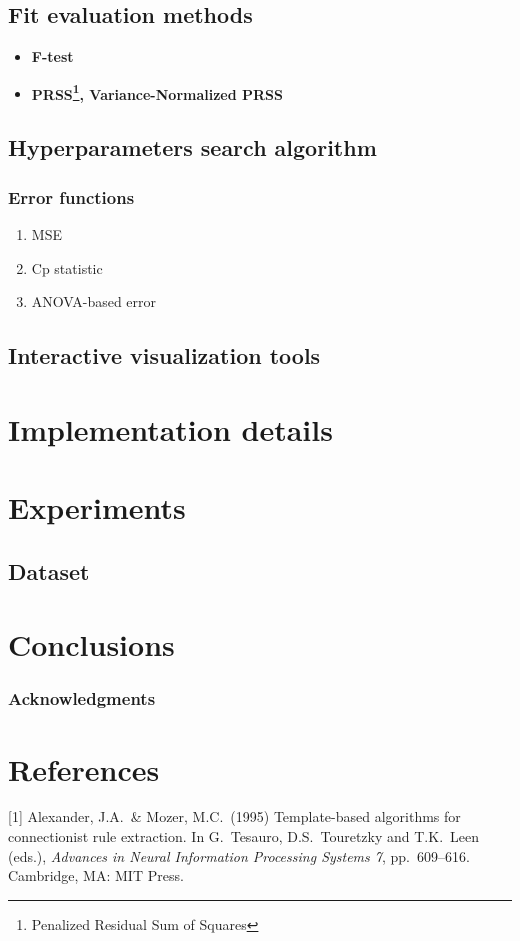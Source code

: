 \documentclass{article}
\begin{document}
\subsection{Fit evaluation methods}

\begin{itemize}
\item \textbf{F-test} 

\item \textbf{PRSS\footnote{Penalized Residual Sum of Squares}, Variance-Normalized PRSS} 

\end{itemize}

\subsection{Hyperparameters search algorithm}

\subsubsection{Error functions}
\begin{enumerate}
\item MSE
\item Cp statistic
\item ANOVA-based error
\end{enumerate}

\subsection{Interactive visualization tools}

\section{Implementation details}

\section{Experiments}

\subsection{Dataset}

\section{Conclusions}

\subsubsection*{Acknowledgments}


\section*{References}
\small

[1] Alexander, J.A.\ \& Mozer, M.C.\ (1995) Template-based algorithms
for connectionist rule extraction. In G.\ Tesauro, D.S.\ Touretzky and
T.K.\ Leen (eds.), {\it Advances in Neural Information Processing
  Systems 7}, pp.\ 609--616. Cambridge, MA: MIT Press.
\end{document}
